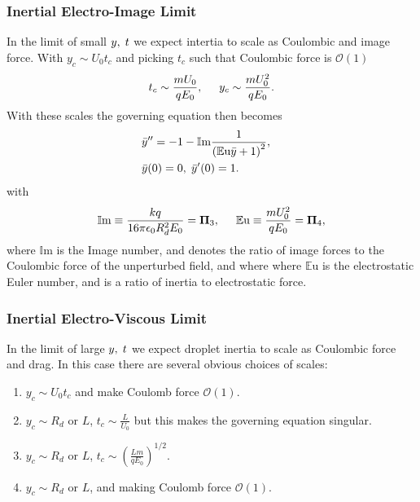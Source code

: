 \documentclass[a4paper, 12pt]{article}
\begin{document}
\subsubsection{Inertial Electro-Image Limit}
In the limit of small $y, \hspace{1mm} t$ we expect intertia to scale as Coulombic and image force. With $y_c \sim U_0 t_c$ and picking $t_c$ such that Coulombic force is $\mathcal{O}(1)$
\[ t_c \sim \frac{m U_0}{q E_0}, \hspace{5 mm}
y_c \sim \frac{m U_0^2}{q E_0} .
\]
With these scales the governing equation then becomes
\begin{eqnarray}
& \bar{y}'' = -1 - \mathbb{I}\mbox{m} \frac{1}{\left( \mathbb{E}\mbox{u}\bar{y} + 1 \right)^2} ,& \nonumber \\
& \bar{y}(0) = 0, \hspace{1 mm} \bar{y}'(0) = 1 .&
\end{eqnarray} 
with 
\[ \mathbb{I}\mbox{m} \equiv \frac{k q}{16 \pi \epsilon_0 R_d^2 E_0} = \mathbf{\Pi}_3, \hspace{5 mm}
\mathbb{E}\mbox{u} \equiv \frac{m U_0^2}{q E_0} = \mathbf{\Pi}_4 ,
\]
where $\mathbb{I}\mbox{m}$ is the Image number, and denotes the ratio of image forces to the Coulombic force of the unperturbed field, and where where $\mathbb{E}\mbox{u}$ is the electrostatic Euler number, and is a ratio of inertia to electrostatic force.

\subsubsection{Inertial Electro-Viscous Limit}
In the limit of large $y, \hspace{1mm} t$ we expect droplet inertia to scale as Coulombic force and drag. In this case there are several obvious choices of scales:
\begin{enumerate}
\item $y_c \sim U_0 t_c$ and make Coulomb force $\mathcal{O}(1)$.
\item $y_c \sim R_d$ or $L$, $t_c \sim \frac{L}{U_0}$ but this makes the governing equation singular.
\item $y_c \sim R_d$ or $L$, $t_c \sim \left( \frac{L m}{q E_0} \right)^{1/2}$.
\item $y_c \sim R_d$ or $L$, and making Coulomb force $\mathcal{O}(1)$.
\end{enumerate}
\end{document}
